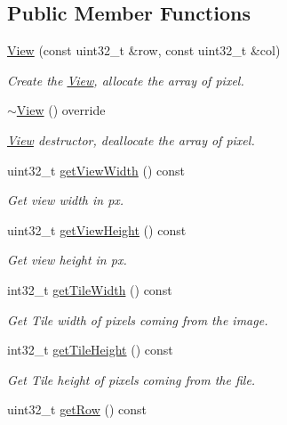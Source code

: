 \subsection*{Public Member Functions}
\begin{DoxyCompactItemize}
\item 
\hyperlink{classfi_1_1View_a08c083035ccc805607ce81bfc199443f}{View} (const uint32\+\_\+t \&row, const uint32\+\_\+t \&col)
\begin{DoxyCompactList}\small\item\em Create the \hyperlink{classfi_1_1View}{View}, allocate the array of pixel. \end{DoxyCompactList}\item 
\hyperlink{classfi_1_1View_aa560ab63a88319b516b974793186fab6}{$\sim$\+View} () override
\begin{DoxyCompactList}\small\item\em \hyperlink{classfi_1_1View}{View} destructor, deallocate the array of pixel. \end{DoxyCompactList}\item 
uint32\+\_\+t \hyperlink{classfi_1_1View_aa2682cae27645a080fb51ce39d1667b4}{get\+View\+Width} () const
\begin{DoxyCompactList}\small\item\em Get view width in px. \end{DoxyCompactList}\item 
uint32\+\_\+t \hyperlink{classfi_1_1View_ad56a6ba2d23c2352403e9e36526a163b}{get\+View\+Height} () const
\begin{DoxyCompactList}\small\item\em Get view height in px. \end{DoxyCompactList}\item 
int32\+\_\+t \hyperlink{classfi_1_1View_a0bfbcd904e7ed80b9f4ed92403825fc4}{get\+Tile\+Width} () const
\begin{DoxyCompactList}\small\item\em Get Tile width of pixels coming from the image. \end{DoxyCompactList}\item 
int32\+\_\+t \hyperlink{classfi_1_1View_a08d9c1b251ce6ce11ff51cde2046a84d}{get\+Tile\+Height} () const
\begin{DoxyCompactList}\small\item\em Get Tile height of pixels coming from the file. \end{DoxyCompactList}\item 
uint32\+\_\+t \hyperlink{classfi_1_1View_a42316b387625b552c0ea5b9c01df49b2}{get\+Row} () const

\end{DoxyCompactItemize}
